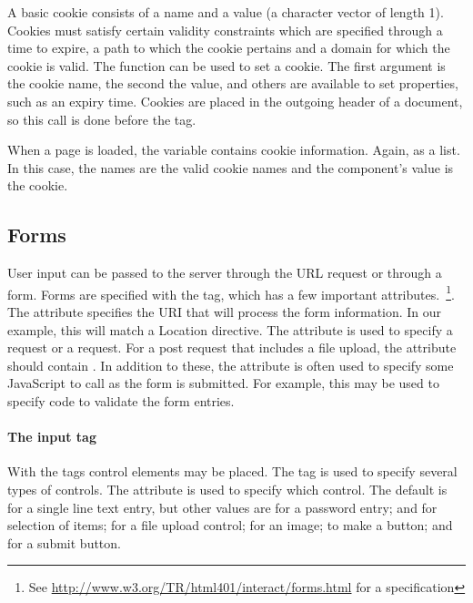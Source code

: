 A basic cookie consists of a name and a value (a character vector of length
1).  Cookies must satisfy certain validity constraints which are
specified through a time to expire, a path to which the cookie
pertains and a domain for which the cookie is valid. The 
function  can be used to set a cookie. The first
argument is the cookie name, the second the value, and others are
available to set properties, such as an expiry time. Cookies are
placed in the outgoing header of a document, so this call is done
before the  tag.

When a page is loaded, the  variable contains cookie
information. Again, as a list. In this case, the names are the valid
cookie names and the component's value is the cookie.


\subsection{Forms}
\label{sec:forms}

User input can be passed to the server through the URL request or
through a form. Forms are specified with the  tag, which
has a few important attributes.~\footnote{See
  \url{http://www.w3.org/TR/html401/interact/forms.html} for a
  specification}. The  attribute specifies the URI that
will process the form information. In our example, this will match a
Location directive. The  attribute is used to specify a
 request or a  request. For a post request that
includes a file upload, the  attribute should contain
. In addition to these, the
 attribute is often used to specify some JavaScript to
call as the form is submitted. For example, this may be used to specify code to
validate the form entries.

\paragraph{The input tag}
With the  tags control elements may be placed. The
 tag is used to specify several types of controls. The
 attribute is used to specify which control. The
default is  for a single line text entry, but other values are
 for a password entry;  and 
for selection of items;  for a file upload control;
 for an image;  to make a button; and
 for a submit button.


